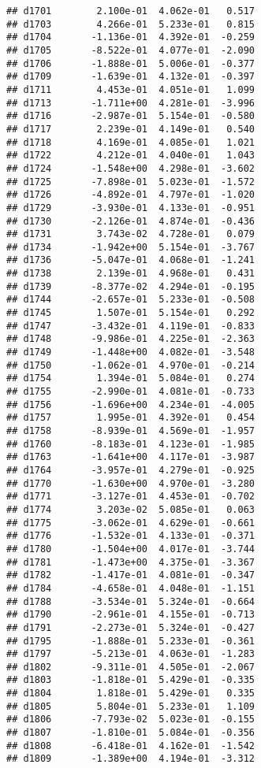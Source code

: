 \documentclass[
]{article}
\begin{document}
\begin{verbatim}
## d1701        2.100e-01  4.062e-01   0.517
## d1703        4.266e-01  5.233e-01   0.815
## d1704       -1.136e-01  4.392e-01  -0.259
## d1705       -8.522e-01  4.077e-01  -2.090
## d1706       -1.888e-01  5.006e-01  -0.377
## d1709       -1.639e-01  4.132e-01  -0.397
## d1711        4.453e-01  4.051e-01   1.099
## d1713       -1.711e+00  4.281e-01  -3.996
## d1716       -2.987e-01  5.154e-01  -0.580
## d1717        2.239e-01  4.149e-01   0.540
## d1718        4.169e-01  4.085e-01   1.021
## d1722        4.212e-01  4.040e-01   1.043
## d1724       -1.548e+00  4.298e-01  -3.602
## d1725       -7.898e-01  5.023e-01  -1.572
## d1726       -4.892e-01  4.797e-01  -1.020
## d1729       -3.930e-01  4.133e-01  -0.951
## d1730       -2.126e-01  4.874e-01  -0.436
## d1731        3.743e-02  4.728e-01   0.079
## d1734       -1.942e+00  5.154e-01  -3.767
## d1736       -5.047e-01  4.068e-01  -1.241
## d1738        2.139e-01  4.968e-01   0.431
## d1739       -8.377e-02  4.294e-01  -0.195
## d1744       -2.657e-01  5.233e-01  -0.508
## d1745        1.507e-01  5.154e-01   0.292
## d1747       -3.432e-01  4.119e-01  -0.833
## d1748       -9.986e-01  4.225e-01  -2.363
## d1749       -1.448e+00  4.082e-01  -3.548
## d1750       -1.062e-01  4.970e-01  -0.214
## d1754        1.394e-01  5.084e-01   0.274
## d1755       -2.990e-01  4.081e-01  -0.733
## d1756       -1.696e+00  4.234e-01  -4.005
## d1757        1.995e-01  4.392e-01   0.454
## d1758       -8.939e-01  4.569e-01  -1.957
## d1760       -8.183e-01  4.123e-01  -1.985
## d1763       -1.641e+00  4.117e-01  -3.987
## d1764       -3.957e-01  4.279e-01  -0.925
## d1770       -1.630e+00  4.970e-01  -3.280
## d1771       -3.127e-01  4.453e-01  -0.702
## d1774        3.203e-02  5.085e-01   0.063
## d1775       -3.062e-01  4.629e-01  -0.661
## d1776       -1.532e-01  4.133e-01  -0.371
## d1780       -1.504e+00  4.017e-01  -3.744
## d1781       -1.473e+00  4.375e-01  -3.367
## d1782       -1.417e-01  4.081e-01  -0.347
## d1784       -4.658e-01  4.048e-01  -1.151
## d1788       -3.534e-01  5.324e-01  -0.664
## d1790       -2.961e-01  4.155e-01  -0.713
## d1791       -2.273e-01  5.324e-01  -0.427
## d1795       -1.888e-01  5.233e-01  -0.361
## d1797       -5.213e-01  4.063e-01  -1.283
## d1802       -9.311e-01  4.505e-01  -2.067
## d1803       -1.818e-01  5.429e-01  -0.335
## d1804        1.818e-01  5.429e-01   0.335
## d1805        5.804e-01  5.233e-01   1.109
## d1806       -7.793e-02  5.023e-01  -0.155
## d1807       -1.810e-01  5.084e-01  -0.356
## d1808       -6.418e-01  4.162e-01  -1.542
## d1809       -1.389e+00  4.194e-01  -3.312

\end{verbatim}
\end{document}
